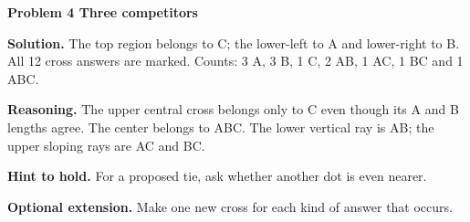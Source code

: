 \documentclass[letterpaper,11pt]{article}
\begin{document}
\vfill
{\large\bfseries Problem 4 Three competitors}\par
\vspace{3pt}
\noindent\begin{minipage}[t]{.58\textwidth}\vspace{0pt}
\fontsize{10.8}{13.2}\selectfont
\textbf{Solution.} The top region belongs to C; the lower-left to A and lower-right to B. All 12 cross answers are marked. Counts: 3 A, 3 B, 1 C, 2 AB, 1 AC, 1 BC and 1 ABC.

\textbf{Reasoning.} The upper central cross belongs only to C even though its A and B lengths agree. The center belongs to ABC. The lower vertical ray is AB; the upper sloping rays are AC and BC.

\textbf{Hint to hold.} For a proposed tie, ask whether another dot is even nearer.

\textbf{Optional extension.} Make one new cross for each kind of answer that occurs.
\end{minipage}\hfill\begin{minipage}[t]{.40\textwidth}\vspace{0pt}\centering
{}
\end{minipage}
\end{document}
